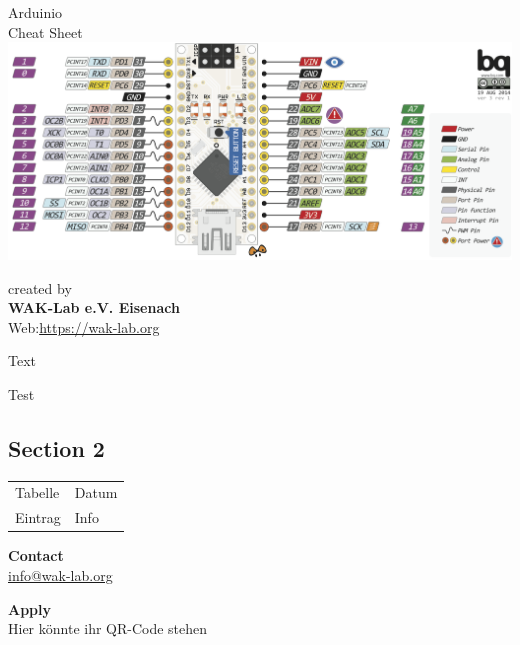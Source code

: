  



\begin{center}
	{\Large Arduinio} \\[.3cm]
	{\huge {Cheat Sheet}}\\ [.3cm]
	
	\includegraphics[width=\linewidth]{pictures/nanoFull.png}\\
	\label{fig:Pinout}

	
	\vfill
	created by\\ 
	\textbf{WAK-Lab e.V. Eisenach}\\
	Web:\url{https://wak-lab.org}
\end{center}


\thispagestyle{empty} 
\newpage




Text

\begin{itemize*} %
	\item Test
\end{itemize*}

\subsection{\large{Section 2}}
\noindent
\begin{tabular}{@{}ll}
	Tabelle & Datum\\
	Eintrag    & Info\\
\end{tabular}

{\large\textbf{{Contact}}}\\
\url{info@wak-lab.org}

\begin{center}
\textbf{Apply} \\
Hier könnte ihr QR-Code stehen\\
\end{center}

